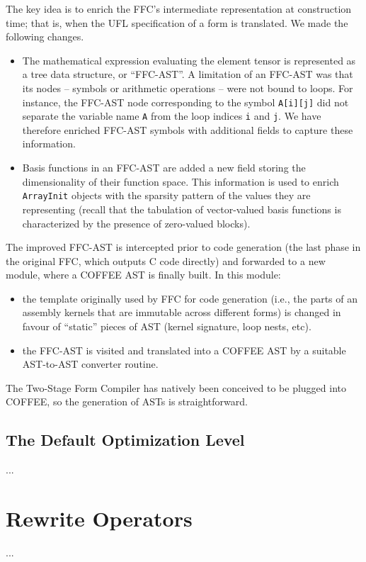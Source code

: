 The key idea is to enrich the FFC's intermediate representation at construction time; that is, when the UFL specification of a form is translated. We made the following changes.
\begin{itemize}
\item The mathematical expression evaluating the element tensor is represented as a tree data structure, or ``FFC-AST''. A limitation of an FFC-AST was that its nodes -- symbols or arithmetic operations -- were not bound to loops. For instance, the FFC-AST node corresponding to the symbol \texttt{A[i][j]} did not separate the variable name \texttt{A} from the loop indices \texttt{i} and \texttt{j}. We have therefore enriched FFC-AST symbols with additional fields to capture these information.
\item Basis functions in an FFC-AST are added a new field storing the dimensionality of their function space. This information is used to enrich \texttt{ArrayInit} objects with the sparsity pattern of the values they are representing (recall that the tabulation of vector-valued basis functions is characterized by the presence of zero-valued blocks).
\end{itemize}

The improved FFC-AST is intercepted prior to code generation (the last phase in the original FFC, which outputs C code directly) and forwarded to a new module, where a COFFEE AST is finally built. In this module:
\begin{itemize}
\item the template originally used by FFC for code generation (i.e., the parts of an assembly kernels that are immutable across different forms) is changed in favour of ``static'' pieces of AST (kernel signature, loop nests, etc).
\item the FFC-AST is visited and translated into a COFFEE AST by a suitable AST-to-AST converter routine.
\end{itemize}

The Two-Stage Form Compiler has natively been conceived to be plugged into COFFEE, so the generation of ASTs is straightforward.

\subsection{The Default Optimization Level}
...

\section{Rewrite Operators}
\label{sec:coffee:rewrite-ops}
...

